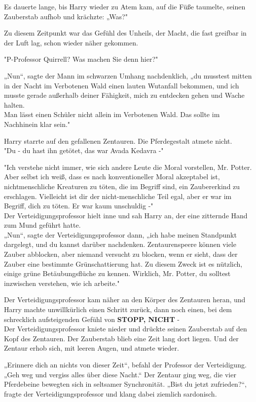 {Es dauerte lange, bis Harry wieder zu Atem kam, auf die Füße taumelte, seinen Zauberstab aufhob und krächzte: „Was?"

Zu diesem Zeitpunkt war das Gefühl des Unheils, der Macht, die fast greifbar in der Luft lag, schon wieder näher gekommen.

"P-Professor Quirrell? Was machen Sie denn hier?"

„Nun“, sagte der Mann im schwarzen Umhang nachdenklich, „du musstest mitten in der Nacht im Verbotenen Wald einen lauten Wutanfall bekommen, und ich musste gerade außerhalb deiner Fähigkeit, mich zu entdecken gehen und Wache halten.\\ Man lässt einen Schüler nicht allein im Verbotenen Wald. Das sollte im Nachhinein klar sein."

Harry starrte auf den gefallenen Zentauren. Die Pferdegestalt atmete nicht.\\ "Du - du hast ihn getötet, das war Avada Kedavra -"

"Ich verstehe nicht immer, wie sich andere Leute die Moral vorstellen, Mr. Potter. Aber selbst ich weiß, dass es nach konventioneller Moral akzeptabel ist, nichtmenschliche Kreaturen zu töten, die im Begriff sind, ein Zaubererkind zu erschlagen. Vielleicht ist dir der nicht-menschliche Teil egal, aber er war im Begriff, dich zu töten. Er war kaum unschuldig -"\\ Der Verteidigungsprofessor hielt inne und sah Harry an, der eine zitternde Hand zum Mund geführt hatte.\\ „Nun“, sagte der Verteidigungsprofessor dann, „ich habe meinen Standpunkt dargelegt, und du kannst darüber nachdenken. Zentaurenspeere können viele Zauber abblocken, aber niemand versucht zu blocken, wenn er sieht, dass der Zauber eine bestimmte Grünschattierung hat. Zu diesem Zweck ist es nützlich, einige grüne Betäubungsflüche zu kennen. Wirklich, Mr. Potter, du solltest inzwischen verstehen, wie ich arbeite."

Der Verteidigungsprofessor kam näher an den Körper des Zentauren heran, und Harry machte unwillkürlich einen Schritt zurück, dann noch einen, bei dem schrecklich aufsteigenden Gefühl von \textbf{STOPP, NICHT} -\\ Der Verteidigungsprofessor kniete nieder und drückte seinen Zauberstab auf den Kopf des Zentauren. Der Zauberstab blieb eine Zeit lang dort liegen. Und der Zentaur erhob sich, mit leeren Augen, und atmete wieder.

„Erinnere dich an nichts von dieser Zeit“, befahl der Professor der Verteidigung. „Geh weg und vergiss alles über diese Nacht.“ Der Zentaur ging weg, die vier Pferdebeine bewegten sich in seltsamer Synchronität. „Bist du jetzt zufrieden?“, fragte der Verteidigungsprofessor und klang dabei ziemlich sardonisch.

}
